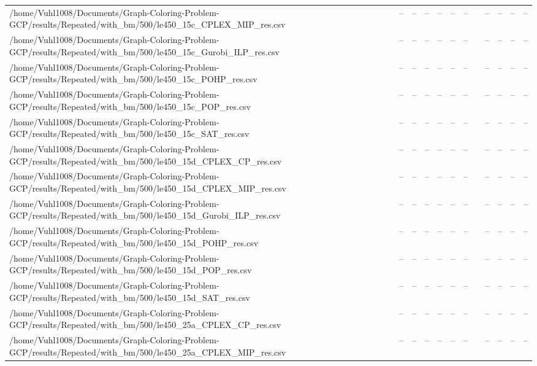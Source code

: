 \begin{table}[htbp]
\begin{tabular}{llllllllllll}
/home/Vuhl1008/Documents/Graph-Coloring-Problem-GCP/results/Repeated/with\_bm/500/le450\_15c\_CPLEX\_MIP\_res.csv & -- & -- & -- & -- & -- & -- & {} & -- & -- & -- & -- \\
/home/Vuhl1008/Documents/Graph-Coloring-Problem-GCP/results/Repeated/with\_bm/500/le450\_15c\_Gurobi\_ILP\_res.csv & -- & -- & -- & -- & -- & -- & {} & -- & -- & -- & -- \\
/home/Vuhl1008/Documents/Graph-Coloring-Problem-GCP/results/Repeated/with\_bm/500/le450\_15c\_POHP\_res.csv & -- & -- & -- & -- & -- & -- & {} & -- & -- & -- & -- \\
/home/Vuhl1008/Documents/Graph-Coloring-Problem-GCP/results/Repeated/with\_bm/500/le450\_15c\_POP\_res.csv & -- & -- & -- & -- & -- & -- & {} & -- & -- & -- & -- \\
/home/Vuhl1008/Documents/Graph-Coloring-Problem-GCP/results/Repeated/with\_bm/500/le450\_15c\_SAT\_res.csv & -- & -- & -- & -- & -- & -- & {} & -- & -- & -- & -- \\
/home/Vuhl1008/Documents/Graph-Coloring-Problem-GCP/results/Repeated/with\_bm/500/le450\_15d\_CPLEX\_CP\_res.csv & -- & -- & -- & -- & -- & -- & {} & -- & -- & -- & -- \\
/home/Vuhl1008/Documents/Graph-Coloring-Problem-GCP/results/Repeated/with\_bm/500/le450\_15d\_CPLEX\_MIP\_res.csv & -- & -- & -- & -- & -- & -- & {} & -- & -- & -- & -- \\
/home/Vuhl1008/Documents/Graph-Coloring-Problem-GCP/results/Repeated/with\_bm/500/le450\_15d\_Gurobi\_ILP\_res.csv & -- & -- & -- & -- & -- & -- & {} & -- & -- & -- & -- \\
/home/Vuhl1008/Documents/Graph-Coloring-Problem-GCP/results/Repeated/with\_bm/500/le450\_15d\_POHP\_res.csv & -- & -- & -- & -- & -- & -- & {} & -- & -- & -- & -- \\
/home/Vuhl1008/Documents/Graph-Coloring-Problem-GCP/results/Repeated/with\_bm/500/le450\_15d\_POP\_res.csv & -- & -- & -- & -- & -- & -- & {} & -- & -- & -- & -- \\
/home/Vuhl1008/Documents/Graph-Coloring-Problem-GCP/results/Repeated/with\_bm/500/le450\_15d\_SAT\_res.csv & -- & -- & -- & -- & -- & -- & {} & -- & -- & -- & -- \\
/home/Vuhl1008/Documents/Graph-Coloring-Problem-GCP/results/Repeated/with\_bm/500/le450\_25a\_CPLEX\_CP\_res.csv & -- & -- & -- & -- & -- & -- & {} & -- & -- & -- & -- \\
/home/Vuhl1008/Documents/Graph-Coloring-Problem-GCP/results/Repeated/with\_bm/500/le450\_25a\_CPLEX\_MIP\_res.csv & -- & -- & -- & -- & -- & -- & {} & -- & -- & -- & -- \\

\end{tabular}
\end{table}
